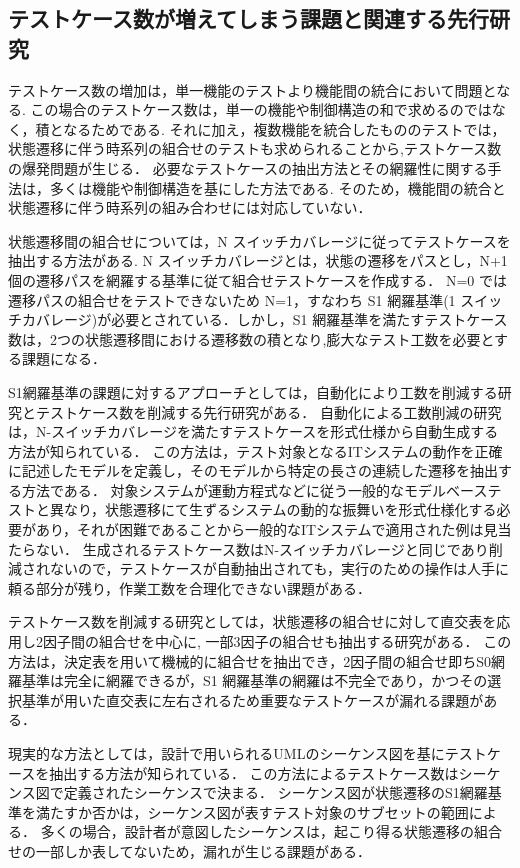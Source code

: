 \subsection{テストケース数が増えてしまう課題と関連する先行研究}
テストケース数の増加は，単一機能のテストより機能間の統合において問題となる.
この場合のテストケース数は，単一の機能や制御構造の和で求めるのではなく，積となるためである.
それに加え，複数機能を統合したもののテストでは，状態遷移に伴う時系列の組合せのテストも求められることから,テストケース数の爆発問題が生じる．
必要なテストケースの抽出方法とその網羅性に関する手法は，多くは機能や制御構造を基にした方法である.\cite{myers2011art}
そのため，機能間の統合と状態遷移に伴う時系列の組み合わせには対応していない．

状態遷移間の組合せについては，N スイッチカバレージに従ってテストケースを抽出する方法がある. \cite{beiz90}
N スイッチカバレージとは，状態の遷移をパスとし，N+1 個の遷移パスを網羅する基準に従て組合せテストケースを作成する．
N=0 では遷移パスの組合せをテストできないため N=1，すなわち S1 網羅基準(1 スイッチカバレージ)が必要とされている．しかし，S1 網羅基準を満たすテストケース数は，2つの状態遷移間における遷移数の積となり,膨大なテスト工数を必要とする課題になる．

S1網羅基準の課題に対するアプローチとしては，自動化により工数を削減する研究とテストケース数を削減する先行研究がある．
自動化による工数削減の研究は，N-スイッチカバレージを満たすテストケースを形式仕様から自動生成する方法が知られている．
この方法は，テスト対象となるITシステムの動作を正確に記述したモデルを定義し，そのモデルから特定の長さの連続した遷移を抽出する方法である\cite{takagi2010concurrent}．
対象システムが運動方程式などに従う一般的なモデルベーステストと異なり，状態遷移にて生ずるシステムの動的な振舞いを形式仕様化する必要があり，それが困難であることから一般的なITシステムで適用された例は見当たらない．
生成されるテストケース数はN-スイッチカバレージと同じであり削減されないので，テストケースが自動抽出されても，実行のための操作は人手に頼る部分が残り，作業工数を合理化できない課題がある．

テストケース数を削減する研究としては，状態遷移の組合せに対して直交表を応用し2因子間の組合せを中心に, 一部3因子の組合せも抽出する研究がある\cite{akiyama2007}\cite{akiyama2012}．
この方法は，決定表を用いて機械的に組合せを抽出でき，2因子間の組合せ即ちS0網羅基準は完全に網羅できるが，S1 網羅基準の網羅は不完全であり，かつその選択基準が用いた直交表に左右されるため重要なテストケースが漏れる課題がある．

現実的な方法としては，設計で用いられるUMLのシーケンス図を基にテストケースを抽出する方法が知られている\cite{hartmann2000uml}．
この方法によるテストケース数はシーケンス図で定義されたシーケンスで決まる．
シーケンス図が状態遷移のS1網羅基準を満たすか否かは，シーケンス図が表すテスト対象のサブセットの範囲による．
多くの場合，設計者が意図したシーケンスは，起こり得る状態遷移の組合せの一部しか表してないため，漏れが生じる課題がある．

